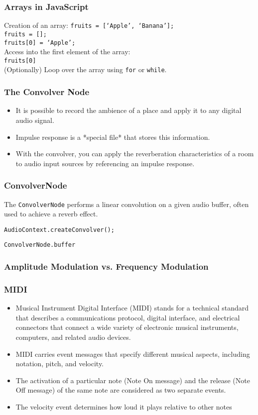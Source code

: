\documentclass[screen, aspectratio=43]{beamer}
\begin{document}
%
\begin{frame}
\frametitle{Arrays in JavaScript}
Creation of an array:
\texttt{fruits = [`Apple', `Banana'];}\\
\texttt{fruits = [];}\\
\texttt{fruits[0] = `Apple';}\\
\vspace{10 mm}
Access into the first element of the array:\\
\texttt{fruits[0]}\\
\vspace{10 mm}
(Optionally) Loop over the array using \texttt{for} or \texttt{while}.\\
\end{frame}
%
\begin{frame}
\frametitle{The Convolver Node}
\begin{itemize}
\item It is possible to record the ambience of a place and apply it to any digital audio signal.
\item Impulse response is a *special file* that stores this information.
\item With the convolver, you can apply the reverberation characteristics of a room to audio input sources by referencing an impulse response.
\end{itemize}
\end{frame}
%
\begin{frame}
\frametitle{ConvolverNode}
The \texttt{ConvolverNode}  performs a linear convolution on a given audio buffer, often used to achieve a reverb effect.\\
\vspace{10 mm}
\centerline{\texttt{AudioContext.createConvolver();}}
\vspace{2 mm}
\centerline{\texttt{ConvolverNode.buffer}}
\vspace{10 mm}
\end{frame}
%
\begin{frame}
\frametitle{Amplitude Modulation vs. Frequency Modulation}
\end{frame}
%
\begin{frame}
\frametitle{MIDI}
\begin{itemize}
\item Musical Instrument Digital Interface (MIDI) stands for a technical standard that describes a communications protocol, digital interface, and electrical connectors that connect a wide variety of electronic musical instruments, computers, and related audio devices.
\item MIDI carries event messages that specify different musical aspects, including notation, pitch, and velocity.
\item The activation of a particular note (Note On message) and the release (Note Off message) of the same note are considered as two separate events.
\item The velocity event determines how loud it plays relative to other notes
\end{itemize}
\end{frame}
\end{document}
